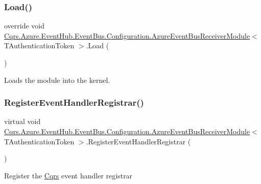\subsubsection{\texorpdfstring{Load()}{Load()}}
{\footnotesize\ttfamily override void \hyperlink{classCqrs_1_1Azure_1_1EventHub_1_1EventBus_1_1Configuration_1_1AzureEventBusReceiverModule}{Cqrs.\+Azure.\+Event\+Hub.\+Event\+Bus.\+Configuration.\+Azure\+Event\+Bus\+Receiver\+Module}$<$ T\+Authentication\+Token $>$.Load (\begin{DoxyParamCaption}{ }\end{DoxyParamCaption})}



Loads the module into the kernel. 

\mbox{\label{classCqrs_1_1Azure_1_1EventHub_1_1EventBus_1_1Configuration_1_1AzureEventBusReceiverModule_ad170174fa51db720544ead9fcd74ecea}} 
\subsubsection{\texorpdfstring{Register\+Event\+Handler\+Registrar()}{RegisterEventHandlerRegistrar()}}
{\footnotesize\ttfamily virtual void \hyperlink{classCqrs_1_1Azure_1_1EventHub_1_1EventBus_1_1Configuration_1_1AzureEventBusReceiverModule}{Cqrs.\+Azure.\+Event\+Hub.\+Event\+Bus.\+Configuration.\+Azure\+Event\+Bus\+Receiver\+Module}$<$ T\+Authentication\+Token $>$.Register\+Event\+Handler\+Registrar (\begin{DoxyParamCaption}{ }\end{DoxyParamCaption})\hspace{0.3cm}{\ttfamily [virtual]}}



Register the \hyperlink{namespaceCqrs}{Cqrs} event handler registrar 



